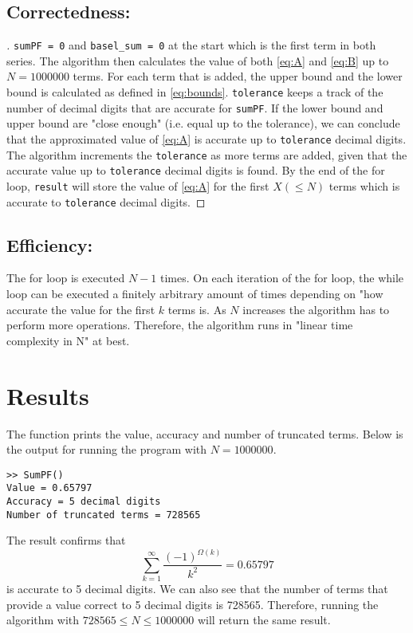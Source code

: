\documentclass[11pt]{report}
\begin{document}
\subsection{Correctedness:}
\begin{proof}[\unskip\nopunct]
\texttt{sumPF = 0} and \texttt{basel\_sum = 0} at the start which is the first term in both series. The algorithm then calculates the value of both \eqref{eq:A} and \eqref{eq:B} up to $N=1000000$ terms. For each term that is added, the upper bound and the lower bound is calculated as defined in \eqref{eq:bounds}. \texttt{tolerance} keeps a track of the number of decimal digits that are accurate for \texttt{sumPF}. If the lower bound and upper bound are "close enough" (i.e. equal up to the tolerance), we can conclude that the approximated value of \eqref{eq:A} is accurate up to \texttt{tolerance} decimal digits. \\

The algorithm increments the \texttt{tolerance} as more terms are added, given that the accurate value up to \texttt{tolerance} decimal digits is found. By the end of the for loop, \texttt{result} will store the value of \eqref{eq:A} for the first $X (\leq N)$ terms which is accurate to \texttt{tolerance} decimal digits.
\end{proof}

\subsection{Efficiency:}
The for loop is executed $N-1$ times. On each iteration of the for loop, the while loop can be executed a finitely arbitrary amount of times depending on "how accurate the value for the first $k$ terms is. As $N$ increases the algorithm has to perform more operations. Therefore, the algorithm runs in "linear time complexity in N" at best.


\section{Results}
The function prints the value, accuracy and number of truncated terms. Below is the output for running the program with $N=1000000$.

\begin{lstlisting}[title={N=1000000}]
>> SumPF()
Value = 0.65797
Accuracy = 5 decimal digits
Number of truncated terms = 728565
\end{lstlisting}
The result confirms that 
\begin{equation*}
	\sum_{k=1}^{\infty} \frac{(-1)^{\Omega(k)}}{k^2} = 0.65797
\end{equation*}
is accurate to 5 decimal digits. We can also see that the number of terms that provide a value correct to 5 decimal digits is 728565. Therefore, running the algorithm with $728565 \leq N \leq 1000000$ will return the same result.
\end{document}
